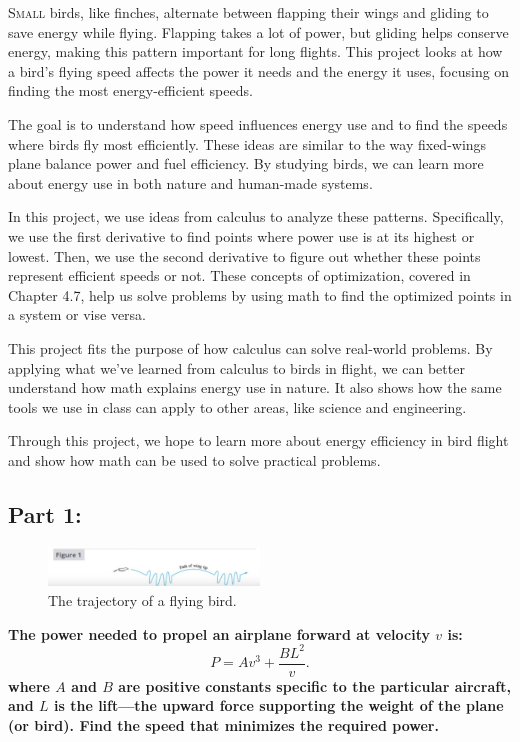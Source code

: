 \documentclass{article}
\begin{document}
{\large \lettrine[lines=2]{S}{mall} birds, like finches, alternate between flapping their wings and gliding to save energy while flying. Flapping takes a lot of power, but gliding helps conserve energy, making this pattern important for long flights. This project looks at how a bird’s flying speed affects the power it needs and the energy it uses, focusing on finding the most energy-efficient speeds.

The goal is to understand how speed influences energy use and to find the speeds where birds fly most efficiently. These ideas are similar to the way fixed-wings plane balance power and fuel efficiency. By studying birds, we can learn more about energy use in both nature and human-made systems.

In this project, we use ideas from calculus to analyze these patterns. Specifically, we use the first derivative to find points where power use is at its highest or lowest. Then, we use the second derivative to figure out whether these points represent efficient speeds or not. These concepts of optimization, covered in Chapter 4.7, help us solve problems by using math to find the optimized points in a system or vise versa.

This project fits the purpose of how calculus can solve real-world problems. By applying what we’ve learned from calculus to birds in flight, we can better understand how math explains energy use in nature. It also shows how the same tools we use in class can apply to other areas, like science and engineering.

Through this project, we hope to learn more about energy efficiency in bird flight and show how math can be used to solve practical problems.}

\newpage


\subsection*{Part 1:}
\begin{figure}[h]
    \centering
    \includegraphics[width=0.5\textwidth]{bird.png}
    \caption{\small The trajectory of a flying bird.}
    \label{fig:bird}
\end{figure}

{\large \bfseries The power needed to propel an airplane forward at velocity \( v \) is: 
}\[
P = Av^3 + \frac{BL^2}{v}.
\]
{\large \bfseries where \( A \) and \( B \) are positive constants specific to the particular aircraft, and \( L \) is the lift—the upward force supporting the weight of the plane (or bird). Find the speed that minimizes the required power.}
\setlength{\parskip}{2em}
\end{document}

